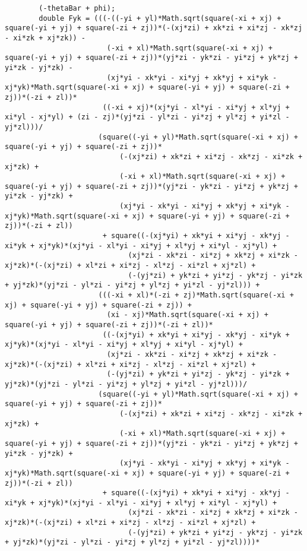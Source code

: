 \begin{lstlisting}
		(-thetaBar + phi);
		double Fyk = (((-((-yi + yl)*Math.sqrt(square(-xi + xj) + square(-yi + yj) + square(-zi + zj))*(-(xj*zi) + xk*zi + xi*zj - xk*zj - xi*zk + xj*zk)) - 
						(-xi + xl)*Math.sqrt(square(-xi + xj) + square(-yi + yj) + square(-zi + zj))*(yj*zi - yk*zi - yi*zj + yk*zj + yi*zk - yj*zk) - 
						(xj*yi - xk*yi - xi*yj + xk*yj + xi*yk - xj*yk)*Math.sqrt(square(-xi + xj) + square(-yi + yj) + square(-zi + zj))*(-zi + zl))*
					   ((-xi + xj)*(xj*yi - xl*yi - xi*yj + xl*yj + xi*yl - xj*yl) + (zi - zj)*(yj*zi - yl*zi - yi*zj + yl*zj + yi*zl - yj*zl)))/
					  (square((-yi + yl)*Math.sqrt(square(-xi + xj) + square(-yi + yj) + square(-zi + zj))*
						   (-(xj*zi) + xk*zi + xi*zj - xk*zj - xi*zk + xj*zk) + 
						   (-xi + xl)*Math.sqrt(square(-xi + xj) + square(-yi + yj) + square(-zi + zj))*(yj*zi - yk*zi - yi*zj + yk*zj + yi*zk - yj*zk) + 
						   (xj*yi - xk*yi - xi*yj + xk*yj + xi*yk - xj*yk)*Math.sqrt(square(-xi + xj) + square(-yi + yj) + square(-zi + zj))*(-zi + zl))
					   + square((-(xj*yi) + xk*yi + xi*yj - xk*yj - xi*yk + xj*yk)*(xj*yi - xl*yi - xi*yj + xl*yj + xi*yl - xj*yl) + 
							 (xj*zi - xk*zi - xi*zj + xk*zj + xi*zk - xj*zk)*(-(xj*zi) + xl*zi + xi*zj - xl*zj - xi*zl + xj*zl) + 
							 (-(yj*zi) + yk*zi + yi*zj - yk*zj - yi*zk + yj*zk)*(yj*zi - yl*zi - yi*zj + yl*zj + yi*zl - yj*zl))) + 
					  (((-xi + xl)*(-zi + zj)*Math.sqrt(square(-xi + xj) + square(-yi + yj) + square(-zi + zj)) + 
						(xi - xj)*Math.sqrt(square(-xi + xj) + square(-yi + yj) + square(-zi + zj))*(-zi + zl))*
					   ((-(xj*yi) + xk*yi + xi*yj - xk*yj - xi*yk + xj*yk)*(xj*yi - xl*yi - xi*yj + xl*yj + xi*yl - xj*yl) + 
						(xj*zi - xk*zi - xi*zj + xk*zj + xi*zk - xj*zk)*(-(xj*zi) + xl*zi + xi*zj - xl*zj - xi*zl + xj*zl) + 
						(-(yj*zi) + yk*zi + yi*zj - yk*zj - yi*zk + yj*zk)*(yj*zi - yl*zi - yi*zj + yl*zj + yi*zl - yj*zl)))/
					  (square((-yi + yl)*Math.sqrt(square(-xi + xj) + square(-yi + yj) + square(-zi + zj))*
						   (-(xj*zi) + xk*zi + xi*zj - xk*zj - xi*zk + xj*zk) + 
						   (-xi + xl)*Math.sqrt(square(-xi + xj) + square(-yi + yj) + square(-zi + zj))*(yj*zi - yk*zi - yi*zj + yk*zj + yi*zk - yj*zk) + 
						   (xj*yi - xk*yi - xi*yj + xk*yj + xi*yk - xj*yk)*Math.sqrt(square(-xi + xj) + square(-yi + yj) + square(-zi + zj))*(-zi + zl))
					   + square((-(xj*yi) + xk*yi + xi*yj - xk*yj - xi*yk + xj*yk)*(xj*yi - xl*yi - xi*yj + xl*yj + xi*yl - xj*yl) + 
							 (xj*zi - xk*zi - xi*zj + xk*zj + xi*zk - xj*zk)*(-(xj*zi) + xl*zi + xi*zj - xl*zj - xi*zl + xj*zl) + 
							 (-(yj*zi) + yk*zi + yi*zj - yk*zj - yi*zk + yj*zk)*(yj*zi - yl*zi - yi*zj + yl*zj + yi*zl - yj*zl))))*

\end{lstlisting}
